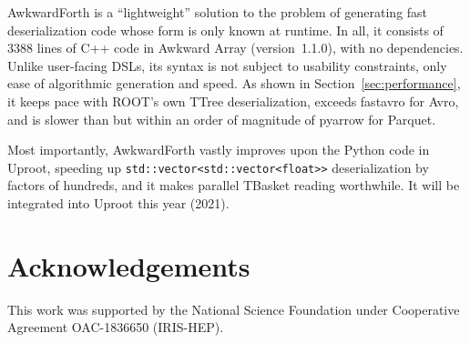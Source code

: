 \documentclass{webofc}
\begin{document}
AwkwardForth is a ``lightweight'' solution to the problem of generating fast deserialization code whose form is only known at runtime. In all, it consists of 3388 lines of C++ code in Awkward Array (version~1.1.0), with no dependencies. Unlike user-facing DSLs, its syntax is not subject to usability constraints, only ease of algorithmic generation and speed. As shown in Section~\ref{sec:performance}, it keeps pace with ROOT's own TTree deserialization, exceeds fastavro for Avro, and is slower than but within an order of magnitude of pyarrow for Parquet.

Most importantly, AwkwardForth vastly improves upon the Python code in Uproot, speeding up \texttt{std::vector<std::vector<float>>} deserialization by factors of hundreds, and it makes parallel TBasket reading worthwhile. It will be integrated into Uproot this year (2021).

\section{Acknowledgements}

This work was supported by the National Science Foundation under Cooperative Agreement OAC-1836650 (IRIS-HEP).






\end{document}
